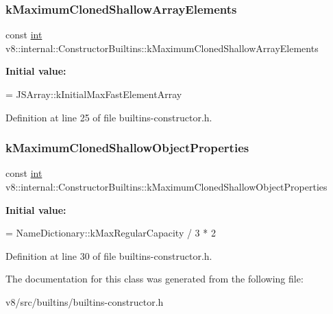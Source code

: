 \subsubsection{\texorpdfstring{k\+Maximum\+Cloned\+Shallow\+Array\+Elements}{kMaximumClonedShallowArrayElements}}
{\footnotesize\ttfamily const \mbox{\hyperlink{classint}{int}} v8\+::internal\+::\+Constructor\+Builtins\+::k\+Maximum\+Cloned\+Shallow\+Array\+Elements\hspace{0.3cm}{\ttfamily [static]}}

{\bfseries Initial value\+:}
\begin{DoxyCode}
=
      JSArray::kInitialMaxFastElementArray
\end{DoxyCode}


Definition at line 25 of file builtins-\/constructor.\+h.

\mbox{\label{classv8_1_1internal_1_1ConstructorBuiltins_ad20cf6da97b7e481eacba9792681ad5d}} 
\subsubsection{\texorpdfstring{k\+Maximum\+Cloned\+Shallow\+Object\+Properties}{kMaximumClonedShallowObjectProperties}}
{\footnotesize\ttfamily const \mbox{\hyperlink{classint}{int}} v8\+::internal\+::\+Constructor\+Builtins\+::k\+Maximum\+Cloned\+Shallow\+Object\+Properties\hspace{0.3cm}{\ttfamily [static]}}

{\bfseries Initial value\+:}
\begin{DoxyCode}
=
      NameDictionary::kMaxRegularCapacity / 3 * 2
\end{DoxyCode}


Definition at line 30 of file builtins-\/constructor.\+h.



The documentation for this class was generated from the following file\+:\begin{DoxyCompactItemize}
\item 
v8/src/builtins/builtins-\/constructor.\+h\end{DoxyCompactItemize}
